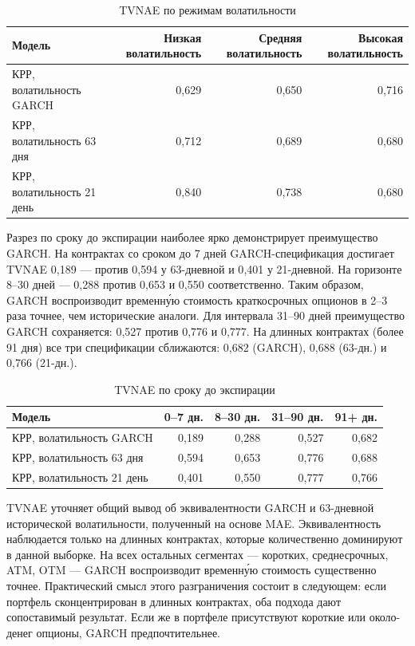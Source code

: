 \documentclass[11pt,a4paper]{article}
\begin{document}
\begin{table}[H]
\centering
\caption{TVNAE по режимам волатильности}
\label{tab:tvnae-vol}
\small
\begin{tabular}{lrrr}
\toprule
Модель & Низкая волатильность & Средняя волатильность & Высокая волатильность \\
\midrule
КРР, волатильность GARCH   & 0{,}629 & 0{,}650 & 0{,}716 \\
КРР, волатильность 63 дня  & 0{,}712 & 0{,}689 & 0{,}680 \\
КРР, волатильность 21 день & 0{,}840 & 0{,}738 & 0{,}680 \\
\bottomrule
\end{tabular}
\end{table}

Разрез по сроку до экспирации наиболее ярко демонстрирует преимущество GARCH. На контрактах со сроком до 7 дней GARCH-спецификация достигает TVNAE 0{,}189 --- против 0{,}594 у 63-дневной и 0{,}401 у 21-дневной. На горизонте 8--30 дней --- 0{,}288 против 0{,}653 и 0{,}550 соответственно. Таким образом, GARCH воспроизводит временну́ю стоимость краткосрочных опционов в 2--3 раза точнее, чем исторические аналоги. Для интервала 31--90 дней преимущество GARCH сохраняется: 0{,}527 против 0{,}776 и 0{,}777. На длинных контрактах (более 91 дня) все три спецификации сближаются: 0{,}682 (GARCH), 0{,}688 (63-дн.) и 0{,}766 (21-дн.).

\begin{table}[H]
\centering
\caption{TVNAE по сроку до экспирации}
\label{tab:tvnae-dte}
\small
\begin{tabular}{lrrrr}
\toprule
Модель & 0--7 дн. & 8--30 дн. & 31--90 дн. & 91+ дн. \\
\midrule
КРР, волатильность GARCH   & 0{,}189 & 0{,}288 & 0{,}527 & 0{,}682 \\
КРР, волатильность 63 дня  & 0{,}594 & 0{,}653 & 0{,}776 & 0{,}688 \\
КРР, волатильность 21 день & 0{,}401 & 0{,}550 & 0{,}777 & 0{,}766 \\
\bottomrule
\end{tabular}
\end{table}

TVNAE уточняет общий вывод об эквивалентности GARCH и 63-дневной исторической волатильности, полученный на основе MAE. Эквивалентность наблюдается только на длинных контрактах, которые количественно доминируют в данной выборке. На всех остальных сегментах --- коротких, среднесрочных, ATM, OTM --- GARCH воспроизводит временну́ю стоимость существенно точнее. Практический смысл этого разграничения состоит в следующем: если портфель сконцентрирован в длинных контрактах, оба подхода дают сопоставимый результат. Если же в портфеле присутствуют короткие или около-денег опционы, GARCH предпочтительнее.
\end{document}
